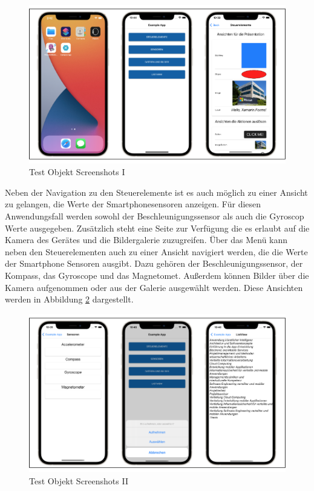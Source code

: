 \newpage
\begin{figure}[!ht]
 \includegraphics[width=\textwidth,keepaspectratio]{Images/Screenshot/AppIconAndMenu.png}
 \caption{Test Objekt Screenshots I}
 \label{fig:TestObjectI}
\end{figure}
Neben der Navigation zu den Steuerelemente ist es auch möglich zu einer Ansicht zu gelangen,  die 
 Werte der Smartphonesensoren anzeigen. Für diesen Anwendungsfall werden sowohl der Beschleunigungssensor als auch die Gyroscop Werte ausgegeben.
 Zusätzlich steht eine Seite zur Verfügung die es erlaubt auf die Kamera des Gerätes und die Bildergalerie zuzugreifen.
Über das Menü kann neben den Steuerelementen auch zu einer Ansicht navigiert werden,  die die Werte der Smartphone Sensoren ausgibt.  Dazu gehören der Beschleunigungssensor,  der Kompass,  das Gyroscope und das Magnetomet. Außerdem können Bilder über die Kamera aufgenommen oder aus der Galerie ausgewählt werden.  Diese Ansichten werden in Abbildung \ref{fig:TestObjectII} dargestellt.

\newpage
\begin{figure}[!ht]
 \includegraphics[width=\textwidth,keepaspectratio]{Images/Screenshot/Sensors.png}
 \caption{Test Objekt Screenshots II}
 \label{fig:TestObjectII}
\end{figure}


